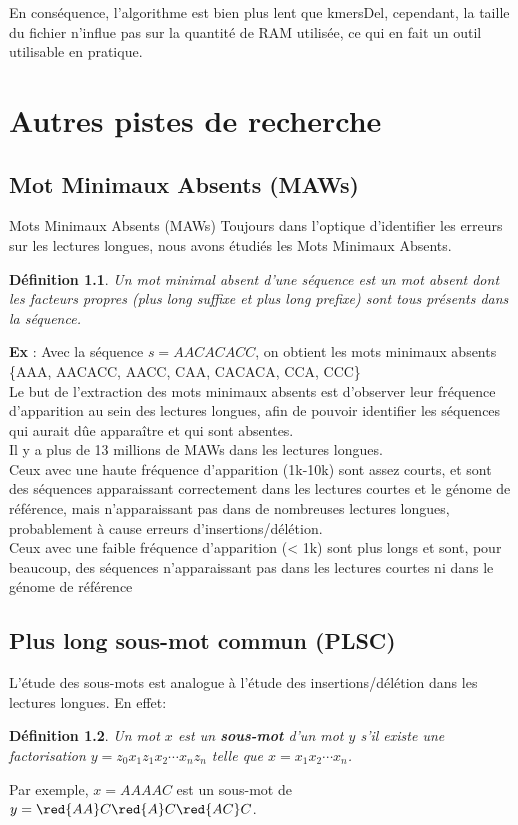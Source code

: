 \documentclass{report}
\newtheorem{defgt}{Définition}
\begin{document}
      En conséquence, l'algorithme est bien plus lent que kmersDel, cependant, la taille du fichier n'influe pas sur la quantité de RAM utilisée, ce qui en fait un outil utilisable en pratique.
      \newpage
  \chapter{Autres pistes de recherche}
    \section{Mot Minimaux Absents (MAWs)}
    \begin{frame}[fragile]{Mots Minimaux Absents (MAWs)}
      Toujours dans l'optique d'identifier les erreurs sur les lectures longues, nous avons étudiés les Mots Minimaux Absents.
      \begin{defgt}
        Un mot minimal absent d'une séquence est un mot absent dont les facteurs propres (plus long suffixe et plus long prefixe) sont tous présents dans la séquence.
      \end{defgt}
      \textbf{Ex} : Avec la séquence $s = AACACACC$, on obtient les mots minimaux absents \{AAA, AACACC, AACC, CAA, CACACA, CCA, CCC\}\\

      Le but de l'extraction des mots minimaux absents est d'observer leur fréquence d'apparition au sein des lectures longues, afin de pouvoir identifier les séquences qui aurait dûe apparaître et qui sont absentes.\\

      Il y a plus de 13 millions de MAWs dans les lectures longues.\\

      Ceux avec une haute fréquence d’apparition (1k-10k) sont assez courts, et sont des séquences apparaissant correctement dans les lectures courtes et le génome de référence, mais n’apparaissant pas dans de nombreuses lectures longues, probablement à cause erreurs d'insertions/délétion.\\

      Ceux avec une faible fréquence d’apparition (< 1k) sont plus longs et sont, pour beaucoup, des séquences n’apparaissant pas dans les lectures courtes ni dans le génome de référence
      \newpage
    \end{frame}
    \section{Plus long sous-mot commun (PLSC)}
      L'étude des sous-mots est analogue à l'étude des insertions/délétion dans les lectures longues. En effet:
      \begin{defgt}
        Un mot $x$ est un \textbf{sous-mot} d'un mot $y$ s'il existe une factorisation $y=z_{0}x_{1}z_{1}x_{2}\cdots x_{n}z_{n}$ telle que $x=x_{1}x_{2}\cdots x_{n}$.
      \end{defgt}
      Par exemple, $x = AAAAC$ est un sous-mot de $y = \red{AA}C\red{A}C\red{AC}C$.\\
\end{document}
